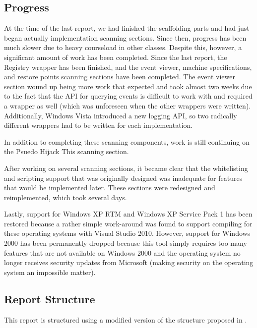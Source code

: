 \documentclass[letterpaper,12pt]{article}
\begin{document}
\subsection{Progress}
At the time of the last report, we had finished the scaffolding parts and had
just began actually implementation scanning sections.  Since then, progress has
been much slower due to heavy courseload in other classes.  Despite this,
however, a significant amount of work has been completed.  Since the last
report, the Registry wrapper has been finished, and the event viewer, machine
specifications, and restore points scanning sections have been completed.  The
event viewer section wound up being more work that expected and took almost two
weeks due to the fact that the API for querying events is difficult to work with
and required a wrapper as well (which was unforeseen when the other wrappers
were written).  Additionally, Windows Vista introduced a new logging API, so two
radically different wrappers had to be written for each implementation.  

In addition to completing these scanning components, work is still continuing on
the Psuedo Hijack This scanning section.  

After working on several scanning sections, it became clear that the
whitelisting and scripting support that was originally designed was inadequate
for features that would be implemented later.  These sections were redesigned
and reimplemented, which took several days.

Lastly, support for Windows XP RTM and Windows XP Service Pack 1 has been
restored because a rather simple work-around was found to support compiling for
these operating systems with Visual Studio 2010.  However, support for Windows
2000 has been permanently dropped because this tool simply requires too many
features that are not available on Windows 2000 and the operating system no
longer receives security updates from Microsoft (making security on the
operating system an impossible matter).

\subsection{Report Structure}
This report is structured using a modified version of the structure proposed in
\cite{ReportGuidelines}.
\end{document}
